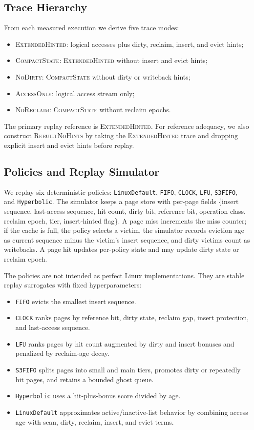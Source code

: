 \documentclass{article}
\newcommand{\traceext}{\textsc{ExtendedHinted}}
\newcommand{\tracecompact}{\textsc{CompactState}}
\newcommand{\tracenodirty}{\textsc{NoDirty}}
\newcommand{\traceaccess}{\textsc{AccessOnly}}
\newcommand{\tracenoreclaim}{\textsc{NoReclaim}}
\newcommand{\rebuilt}{\textsc{RebuiltNoHints}}
\begin{document}
\subsection{Trace Hierarchy}
From each measured execution we derive five trace modes:
\begin{itemize}
  \item \traceext{}: logical accesses plus dirty, reclaim, insert, and evict hints;
  \item \tracecompact{}: \traceext{} without insert and evict hints;
  \item \tracenodirty{}: \tracecompact{} without dirty or writeback hints;
  \item \traceaccess{}: logical access stream only;
  \item \tracenoreclaim{}: \tracecompact{} without reclaim epochs.
\end{itemize}

The primary replay reference is \traceext{}. For reference adequacy, we also construct \rebuilt{} by taking the \traceext{} trace and dropping explicit insert and evict hints before replay.

\subsection{Policies and Replay Simulator}
We replay six deterministic policies: \texttt{LinuxDefault}, \texttt{FIFO}, \texttt{CLOCK}, \texttt{LFU}, \texttt{S3FIFO}, and \texttt{Hyperbolic}. The simulator keeps a page store with per-page fields \{insert sequence, last-access sequence, hit count, dirty bit, reference bit, operation class, reclaim epoch, tier, insert-hinted flag\}. A page miss increments the miss counter; if the cache is full, the policy selects a victim, the simulator records eviction age as current sequence minus the victim's insert sequence, and dirty victims count as writebacks. A page hit updates per-policy state and may update dirty state or reclaim epoch.

The policies are not intended as perfect Linux implementations. They are stable replay surrogates with fixed hyperparameters:
\begin{itemize}
  \item \texttt{FIFO} evicts the smallest insert sequence.
  \item \texttt{CLOCK} ranks pages by reference bit, dirty state, reclaim gap, insert protection, and last-access sequence.
  \item \texttt{LFU} ranks pages by hit count augmented by dirty and insert bonuses and penalized by reclaim-age decay.
  \item \texttt{S3FIFO} splits pages into small and main tiers, promotes dirty or repeatedly hit pages, and retains a bounded ghost queue.
  \item \texttt{Hyperbolic} uses a hit-plus-bonus score divided by age.
  \item \texttt{LinuxDefault} approximates active/inactive-list behavior by combining access age with scan, dirty, reclaim, insert, and evict terms.
\end{itemize}
\end{document}
